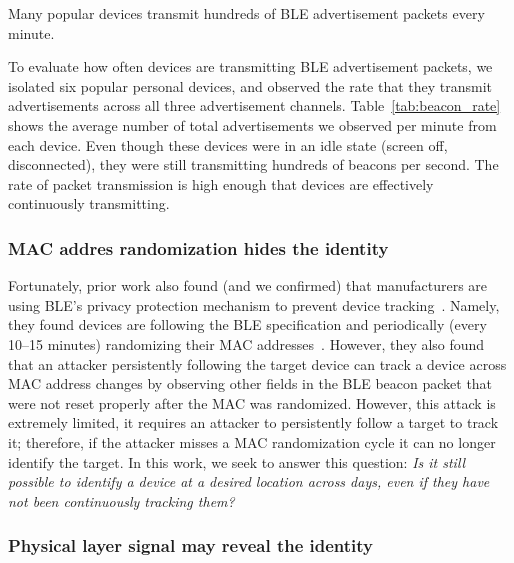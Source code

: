 \begin{table}
    \centering\small
    
    \caption{Many popular devices transmit hundreds of BLE advertisement packets every minute.}
    \label{tab:beacon_rate}
\end{table}

To evaluate how often devices are transmitting BLE advertisement packets, we
isolated six popular personal devices, and observed the rate that they transmit
advertisements across all three advertisement channels. 
%
Table~\ref{tab:beacon_rate} shows the average number of total advertisements we
observed per minute from each device.
%
Even though these devices were in an idle state (screen off, disconnected),
they were still transmitting hundreds of beacons per second.
%
The rate of packet transmission is high enough that devices are effectively
continuously transmitting.
%

\subsubsection*{MAC addres randomization hides the identity}

Fortunately, prior work also found (and we confirmed) that manufacturers are
using BLE's privacy protection mechanism to prevent device
tracking~\cite{Iphonetracking_becker,MACRandomizationfail_Martin}.
%
Namely, they found devices are following the BLE specification and periodically (every 10--15 minutes) randomizing
their MAC addresses~\cite{BTsigprivacy}.
%
However, they also found that an attacker persistently following the target
device can track a device across MAC address changes by observing other fields
in the BLE beacon packet that were not reset properly after the MAC was
randomized.
%
However, this attack is extremely limited, it requires an attacker to
persistently follow a target to track it; therefore, if the attacker misses a
MAC randomization cycle it can no longer identify the target.
%
In this work, we seek to answer this question: \textit{Is it still possible to identify a device at a desired location across days, even if they
have not been continuously tracking them?}

\subsubsection*{Physical layer signal may reveal the identity}

